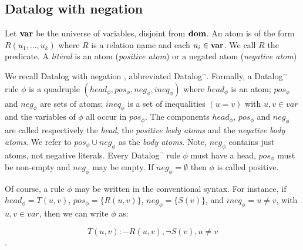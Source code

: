 \documentclass{pracamgr}
\theoremstyle{plain}
\theoremstyle{definition}
\theoremstyle{remark}
\begin{document}


\subsection{Datalog with negation}
Let $\bf{var}$ be the universe of variables, disjoint from $\bf{dom}$. An atom is of the form $R(u_1 , \dots, u_k)$ where $R$ is a relation name and each $u_i \in \bf{var}$. We call $R$ the predicate. A \emph{literal} is an atom (\emph{positive atom}) or a negated atom (\emph{negative atom})


We recall Datalog with negation \cite{fod}, abbreviated Datalog$^\neg$.
Formally, a Datalog$^\neg$ rule $\phi$ is a quadruple $(head_\phi, pos_\phi,
neg_\phi , ineq_\phi)$ where $head_\phi$ is an atom; $pos_\phi$ and $neg_\phi$ are
sets of atoms; $ineq_\phi$ is a set of inequalities $(u = v)$ with
$u, v \in var$ and the variables of $\phi$ all occur in $pos_\phi$. The
components $head_\phi$, $pos_\phi$ and $neg_\phi$ are called respectively the
\emph{head}, the \emph{positive body atoms} and the \emph{negative body atoms}.
We refer to $pos_\phi \cup neg_\phi$ as the \emph{body atoms}. Note, $neg_\phi$
contains just atoms, not negative literals. Every Datalog$^\neg$
rule $\phi$ must have a head, $pos_\phi$ must be non-empty and $neg_\phi$
may be empty. If $neg_\phi = \emptyset$ then $\phi$ is called positive.

Of course, a rule $\phi$ may be written in the conventional syntax. For instance, if $head_\phi = T(u, v)$, $pos_\phi = \{R(u, v)\}$, $
neg_\phi = \{S(v)\}$, and $ineq_\phi = {u \ne v}$, with $u, v \in var$,
then we can write $\phi$ as:

$$T (u, v) :- R(u, v), \neg S(v), u \ne v$$.
\end{document}
